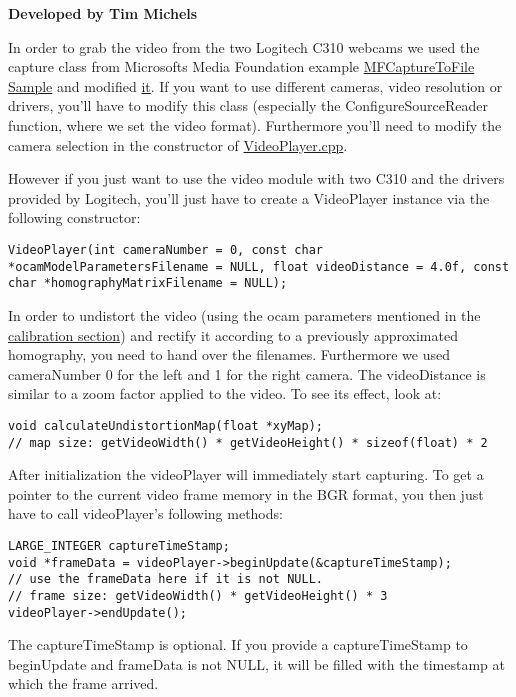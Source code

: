 \begin{center}
\textbf{Developed by Tim Michels}
\end{center}
In order to grab the video from the two Logitech C310 webcams we used the capture
class from Microsofts Media Foundation example
\href{https://msdn.microsoft.com/en-us/library/windows/desktop/ee663604\%28v=vs.85\%29.aspx}{MFCaptureToFile Sample}\cite{mfcapturetofile}
and modified
\href{https://github.com/ands/OculusMeetsAR/blob/master/ARLib/src/Video/CCapture.cpp}{it}.
If you want to use different cameras, video resolution or drivers,
you'll have to modify this class (especially the ConfigureSourceReader
function, where we set the video format). Furthermore you'll need to
modify the camera selection in the constructor of
\href{https://github.com/ands/OculusMeetsAR/blob/master/ARLib/src/Video/videoplayer.cpp}{VideoPlayer.cpp}.

However if you just want to use the video module with two C310\cite{c310} and the
drivers provided by Logitech, you'll just have to create a VideoPlayer
instance via the following constructor:
\begin{lstlisting}
VideoPlayer(int cameraNumber = 0, const char *ocamModelParametersFilename = NULL, float videoDistance = 4.0f, const char *homographyMatrixFilename = NULL);
\end{lstlisting}
In order to undistort the video (using the ocam parameters mentioned in
the \hyperref[sec:stereo_calibration]{calibration section}) and rectify it according to a previously approximated homography, you need to hand over the filenames. Furthermore we used cameraNumber 0 for the left and 1 for the right camera. The videoDistance is similar to a zoom factor applied to the video. To see its effect, look at:
\begin{lstlisting}
void calculateUndistortionMap(float *xyMap);
// map size: getVideoWidth() * getVideoHeight() * sizeof(float) * 2
\end{lstlisting}

After initialization the videoPlayer will immediately start capturing.
To get a pointer to the current video frame memory in the BGR format, you then just have to call videoPlayer's following methods:
\begin{lstlisting}
LARGE_INTEGER captureTimeStamp;
void *frameData = videoPlayer->beginUpdate(&captureTimeStamp);
// use the frameData here if it is not NULL.
// frame size: getVideoWidth() * getVideoHeight() * 3
videoPlayer->endUpdate();
\end{lstlisting}
The captureTimeStamp is optional. If you provide a captureTimeStamp to beginUpdate and frameData is not NULL, it will be filled with the timestamp at which the frame arrived.

